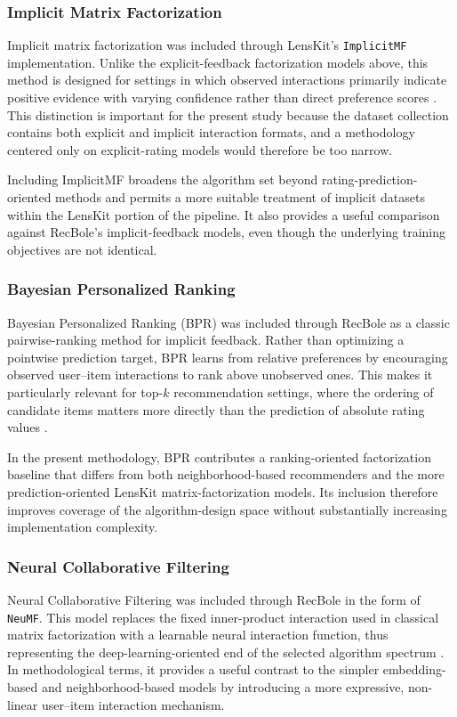 \documentclass[12pt,a4paper]{article}
\begin{document}
\subsubsection{Implicit Matrix Factorization}
Implicit matrix factorization was included through LensKit's \texttt{ImplicitMF} implementation. Unlike the explicit-feedback factorization models above, this method is designed for settings in which observed interactions primarily indicate positive evidence with varying confidence rather than direct preference scores \cite{implicitmf}. This distinction is important for the present study because the dataset collection contains both explicit and implicit interaction formats, and a methodology centered only on explicit-rating models would therefore be too narrow.

Including ImplicitMF broadens the algorithm set beyond rating-prediction-oriented methods and permits a more suitable treatment of implicit datasets within the LensKit portion of the pipeline. It also provides a useful comparison against RecBole's implicit-feedback models, even though the underlying training objectives are not identical.

\subsubsection{Bayesian Personalized Ranking}
Bayesian Personalized Ranking (BPR) was included through RecBole as a classic pairwise-ranking method for implicit feedback. Rather than optimizing a pointwise prediction target, BPR learns from relative preferences by encouraging observed user--item interactions to rank above unobserved ones. This makes it particularly relevant for top-$k$ recommendation settings, where the ordering of candidate items matters more directly than the prediction of absolute rating values \cite{bpr}.

In the present methodology, BPR contributes a ranking-oriented factorization baseline that differs from both neighborhood-based recommenders and the more prediction-oriented LensKit matrix-factorization models. Its inclusion therefore improves coverage of the algorithm-design space without substantially increasing implementation complexity.

\subsubsection{Neural Collaborative Filtering}
Neural Collaborative Filtering was included through RecBole in the form of \texttt{NeuMF}. This model replaces the fixed inner-product interaction used in classical matrix factorization with a learnable neural interaction function, thus representing the deep-learning-oriented end of the selected algorithm spectrum \cite{neumf}. In methodological terms, it provides a useful contrast to the simpler embedding-based and neighborhood-based models by introducing a more expressive, non-linear user--item interaction mechanism.
\end{document}
